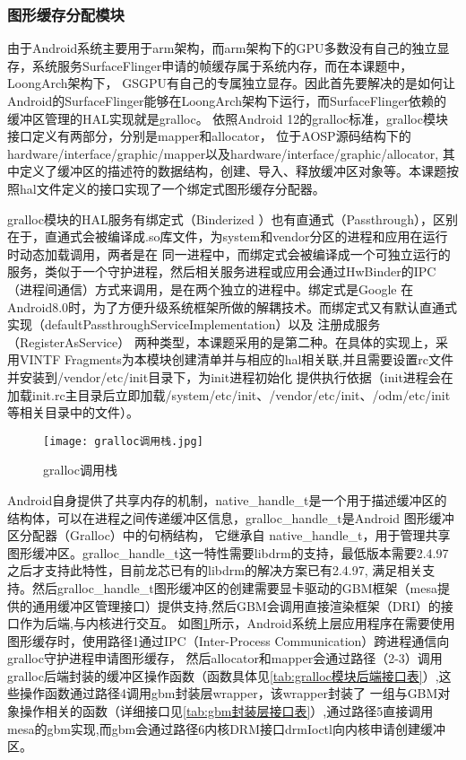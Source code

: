 \subsubsection{图形缓存分配模块}
由于Android系统主要用于arm架构，而arm架构下的GPU多数没有自己的独立显存，系统服务SurfaceFlinger申请的帧缓存属于系统内存，而在本课题中，LoongArch架构下，
GSGPU有自己的专属独立显存。因此首先要解决的是如何让Android的SurfaceFlinger能够在LoongArch架构下运行，而SurfaceFlinger依赖的缓冲区管理的HAL实现就是gralloc。
依照Android 12的gralloc标准，gralloc模块接口定义有两部分，分别是mapper和allocator，
位于AOSP源码结构下的hardware/interface/graphic/mapper以及hardware/interface/graphic/allocator,
其中定义了缓冲区的描述符的数据结构，创建、导入、释放缓冲区对象等。本课题按照hal文件定义的接口实现了一个绑定式图形缓存分配器。

gralloc模块的HAL服务有绑定式（Binderized ）也有直通式（Passthrough），区别在于，直通式会被编译成.so库文件，为system和vendor分区的进程和应用在运行时动态加载调用，两者是在
同一进程中，而绑定式会被编译成一个可独立运行的服务，类似于一个守护进程，然后相关服务进程或应用会通过HwBinder的IPC（进程间通信）方式来调用，是在两个独立的进程中。绑定式是Google
在Android8.0时，为了方便升级系统框架所做的解耦技术。而绑定式又有默认直通式实现（defaultPassthroughServiceImplementation）以及 注册成服务（RegisterAsService）
两种类型，本课题采用的是第二种。在具体的实现上，采用VINTF Fragments为本模块创建清单并与相应的hal相关联,并且需要设置rc文件并安装到/vendor/etc/init目录下，为init进程初始化
提供执行依据（init进程会在加载init.rc主目录后立即加载/system/etc/init、/vendor/etc/init、/odm/etc/init等相关目录中的文件）。

\begin{figure}[h]
  \centering
  \texttt{[image: gralloc调用栈.jpg]}
  \caption{gralloc调用栈}
  \label{fig:gralloc调用栈}
\end{figure}

Android自身提供了共享内存的机制，native\_handle\_t是一个用于描述缓冲区的结构体，可以在进程之间传递缓冲区信息，gralloc\_handle\_t是Android 图形缓冲区分配器（Gralloc）中的句柄结构，
它继承自 native\_handle\_t，用于管理共享图形缓冲区。gralloc\_handle\_t这一特性需要libdrm的支持，最低版本需要2.4.97之后才支持此特性，目前龙芯已有的libdrm的解决方案已有2.4.97,
满足相关支持。然后gralloc\_handle\_t图形缓冲区的创建需要显卡驱动的GBM框架（mesa提供的通用缓冲区管理接口）提供支持,然后GBM会调用直接渲染框架（DRI）的接口作为后端,与内核进行交互。
如图\ref{fig:gralloc调用栈}所示，Android系统上层应用程序在需要使用图形缓存时，使用路径1通过IPC（Inter-Process Communication）跨进程通信向gralloc守护进程申请图形缓存，
然后allocator和mapper会通过路径（2-3）调用gralloc后端封装的缓冲区操作函数（函数具体见\ref{tab:gralloc模块后端接口表}）,这些操作函数通过路径4调用gbm封装层wrapper，该wrapper封装了
一组与GBM对象操作相关的函数（详细接口见\ref{tab:gbm封装层接口表}）,通过路径5直接调用mesa的gbm实现,而gbm会通过路径6内核DRM接口drmIoctl向内核申请创建缓冲区。

